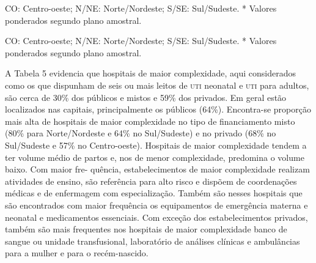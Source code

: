 \documentclass{article}
\begin{document}
CO: Centro-oeste; N/NE: Norte/Nordeste; S/SE: Sul/Sudeste. * Valores
ponderados segundo plano amostral.

CO: Centro-oeste; N/NE: Norte/Nordeste; S/SE: Sul/Sudeste. * Valores
ponderados segundo plano amostral.

A Tabela 5 evidencia que hospitais de maior
complexidade, aqui considerados como os que dispunham de seis ou mais leitos de
\textsc{uti}
neonatal e \textsc{uti} para adultos, são cerca de 30\% dos públicos e mistos e 59\% dos
privados. Em geral estão localizados nas capitais, principalmente os públicos
(64\%).
Encontra-se proporção mais alta de hospitais de maior complexidade no tipo de
financiamento misto (80\% para Norte/Nordeste e 64\% no Sul/Sudeste) e no
privado (68\%
no Sul/Sudeste e 57\% no Centro-oeste). Hospitais de maior complexidade tendem a
ter
volume médio de partos e, nos de menor complexidade, predomina o volume baixo.
Com
maior fre- quência, estabelecimentos de maior complexidade realizam atividades
de
ensino, são referência para alto risco e dispõem de coordenações médicas e de
enfermagem com especialização. Também são nesses hospitais que são encontrados
com
maior frequência os equipamentos de emergência materna e neonatal e medicamentos
essenciais. Com exceção dos estabelecimentos privados, também são mais
frequentes
nos hospitais de maior complexidade banco de sangue ou unidade transfusional,
laboratório de análises clínicas e ambulâncias para a mulher e para o
recém-nascido.
\end{document}
